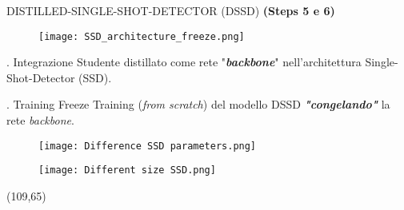 \begin{frame}{DISTILLED-SINGLE-SHOT-DETECTOR (DSSD)}
    {\bfseries{\scriptsize{(Steps 5 e 6)}}}
    \vspace{-1.8cm}
    \begin{figure}
        \centering
        \texttt{[image: SSD\_architecture\_freeze.png]}
        \centering
    \end{figure}
    \vspace{-0.5cm}
    \begin{minipage}{\linewidth}
        \centering
        \begin{minipage}{0.40\linewidth}
            {\footnotesize
                \vspace{-0.3cm}
                \begin{block}{. Integrazione}
                    Studente distillato come rete "{\bfseries{\emph{backbone}}}" nell'architettura {Single-Shot-Detector (SSD)}.    
                \end{block}
                \vspace{-0.2cm}
                \begin{block}{. Training Freeze}
                    Training (\emph{from scratch}) del modello DSSD {\bfseries{\emph{"congelando"}}} la rete \emph{backbone}.
                \end{block}
            }%
        \end{minipage}
        \begin{minipage}{0.55\linewidth}
            \begin{figure}
                \centering
                \texttt{[image: Difference SSD parameters.png]}
                \centering
            \end{figure}
            \vspace{-0.7cm}
            \begin{figure}
                \centering
                \texttt{[image: Different size SSD.png]}
                \centering
            \end{figure}
        \end{minipage}
        \vspace{-2.5cm}
    \end{minipage}   
    \begin{textblock}{10}(109,65)
    \end{textblock}
\end{frame}

